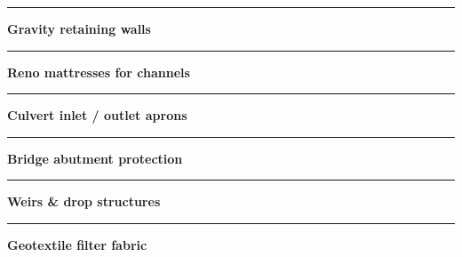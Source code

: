 \begin{minipage}[t]{0.34\textwidth}
    \vspace{0pt}
    \begin{tcolorbox}[
        enhanced, colback=mhoffwhite, colframe=mhnavy, boxrule=0.8pt, arc=4pt,
        title={\bfseries\color{white}\faLayerGroup\ Gabion Scope of Work},
        colbacktitle=mhnavy, left=7pt, right=7pt, top=5pt, bottom=5pt,
        drop shadow=black!4
    ]
        \fontsize{7.8pt}{11.0pt}\selectfont
        \textcolor{mhnavy}{\rule{3.5pt}{3.5pt}}\hspace{4pt}\textbf{Gravity retaining walls}\\
        \textcolor{mhnavy}{\rule{3.5pt}{3.5pt}}\hspace{4pt}\textbf{Reno mattresses for channels}\\
        \textcolor{mhnavy}{\rule{3.5pt}{3.5pt}}\hspace{4pt}\textbf{Culvert inlet / outlet aprons}\\
        \textcolor{mhnavy}{\rule{3.5pt}{3.5pt}}\hspace{4pt}\textbf{Bridge abutment protection}\\
        \textcolor{mhnavy}{\rule{3.5pt}{3.5pt}}\hspace{4pt}\textbf{Weirs \& drop structures}\\
        \textcolor{mhnavy}{\rule{3.5pt}{3.5pt}}\hspace{4pt}\textbf{Geotextile filter fabric}
    \end{tcolorbox}
\end{minipage}

\vfill

